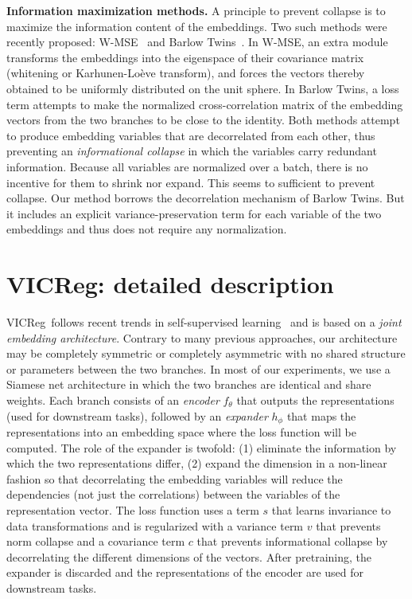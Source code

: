 \documentclass{article}
\newcommand{\algo}{VICReg}
\newcommand{\expander}{expander }
\begin{document}
\vspace{2mm}
\noindent \textbf{Information maximization methods.} A principle to prevent collapse is to maximize the information content of the embeddings. Two such methods were recently proposed: W-MSE~\cite{ermolov2021whitening} and Barlow Twins~\cite{zbontar2021barlow}.
In W-MSE, an extra module transforms the embeddings into the eigenspace of their covariance matrix (whitening or Karhunen-Loève transform), and forces the vectors thereby obtained to be uniformly distributed on the unit sphere.
In Barlow Twins, a loss term attempts to make the normalized cross-correlation matrix of the embedding vectors from the two branches to be close to the identity. 
Both methods attempt to produce embedding variables that are decorrelated from each other, thus preventing an {\em informational collapse} in which the variables carry redundant information. Because all variables are normalized over a batch, there is no incentive for them to shrink nor expand. This seems to sufficient to prevent collapse.
Our method borrows the decorrelation mechanism of Barlow Twins. But it includes an explicit variance-preservation term for each variable of the two embeddings and thus does not require any normalization.
    
\section{VICReg: detailed description} \label{sec:method}

\algo \ follows recent trends in self-supervised learning~\cite{caron2020swav, grill2020byol, chen2020simsiam, zbontar2021barlow, chen2020simclr} and is based on a {\em joint embedding architecture}. Contrary to many previous approaches, our architecture may be completely symmetric or completely asymmetric with no shared structure or parameters between the two branches. In most of our experiments, we use a Siamese net architecture in which the two branches are identical and share weights. Each branch consists of an {\em encoder} $f_{\theta}$ that outputs the representations (used for downstream tasks), followed by an {\em expander} $h_{\phi}$ that maps the representations into an embedding space where the loss function will be computed. The role of the \expander is twofold: (1) eliminate the information by which the two representations differ, (2) expand the dimension in a non-linear fashion so that decorrelating the embedding variables will reduce the dependencies (not just the correlations) between the variables of the representation vector. The loss function uses a term $s$ that learns invariance to data transformations and is regularized with a variance term $v$ that prevents norm collapse and a covariance term $c$ that prevents informational collapse by decorrelating the different dimensions of the vectors. After pretraining, the \expander is discarded and the representations of the encoder are used for downstream tasks.
\end{document}
